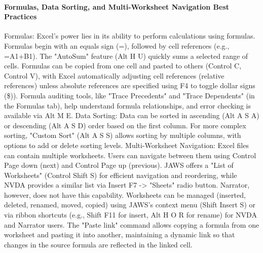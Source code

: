 \paragraph{Formulas, Data Sorting, and Multi-Worksheet Navigation Best Practices}
Formulas: Excel's power lies in its ability to perform calculations using formulas. Formulas begin with an equals sign (=), followed by cell references (e.g., =A1+B1).\supercite{kingsbury2025} The "AutoSum" feature (Alt H U) quickly sums a selected range of cells.\supercite{kingsbury2025} Formulas can be copied from one cell and pasted to others (Control C, Control V), with Excel automatically adjusting cell references (relative references) unless absolute references are specified using F4 to toggle dollar signs (\$)).\supercite{kingsbury2025} Formula auditing tools, like "Trace Precedents" and "Trace Dependents" (in the Formulas tab), help understand formula relationships, and error checking is available via Alt M E.\supercite{kingsbury2025}
Data Sorting: Data can be sorted in ascending (Alt A S A) or descending (Alt A S D) order based on the first column.\supercite{kingsbury2025} For more complex sorting, "Custom Sort" (Alt A S S) allows sorting by multiple columns, with options to add or delete sorting levels.\supercite{kingsbury2025}
Multi-Worksheet Navigation: Excel files can contain multiple worksheets. Users can navigate between them using Control Page down (next) and Control Page up (previous).\supercite{kingsbury2025} JAWS offers a "List of Worksheets" (Control Shift S) for efficient navigation and reordering, while NVDA provides a similar list via Insert F7 -\textgreater{} "Sheets" radio button. Narrator, however, does not have this capability.\supercite{kingsbury2025} Worksheets can be managed (inserted, deleted, renamed, moved, copied) using JAWS's context menu (Shift Insert S) or via ribbon shortcuts (e.g., Shift F11 for insert, Alt H O R for rename) for NVDA and Narrator users.\supercite{kingsbury2025} The "Paste link" command allows copying a formula from one worksheet and pasting it into another, maintaining a dynamic link so that changes in the source formula are reflected in the linked cell.\supercite{kingsbury2025}

